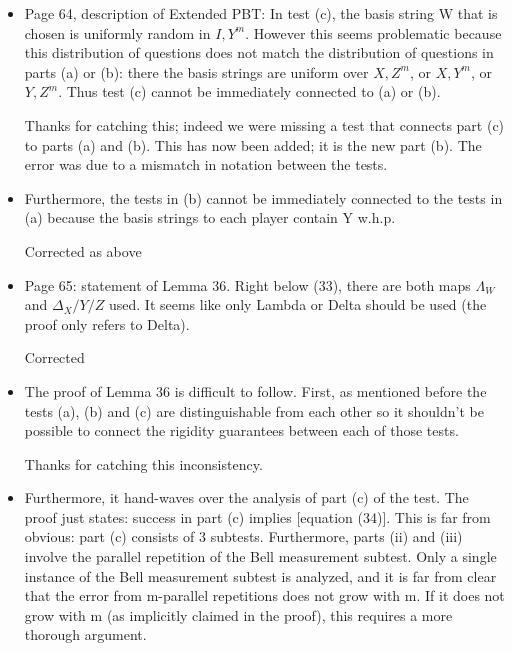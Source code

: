 \documentclass[12pt]{article}
\begin{document}
\begin{itemize}
\item Page 64, description of Extended PBT: In test (c), the basis string W that is chosen is uniformly random in ${I, Y}^m$. However this seems problematic because this distribution of questions does not match the distribution of questions in parts (a) or (b): there the basis strings are uniform over ${X,Z}^m$, or ${X,Y}^m$, or ${Y,Z}^m$. Thus test (c) cannot be immediately connected to (a) or (b).

{\color{blue} Thanks for catching this; indeed we were missing a test that connects part (c) to parts (a) and (b). This has now been added; it is the new part (b). The error was due to a mismatch in notation between the tests.}

\item Furthermore, the tests in (b) cannot be immediately connected to the tests in (a) because the basis strings to each player contain Y w.h.p.

{\color{blue} Corrected as above}

\item Page 65: statement of Lemma 36. Right below (33), there are both maps $\Lambda_W$ and $\Delta_X/Y/Z$ used. It seems like only Lambda or Delta should be used (the proof only refers to Delta).

{\color{blue} Corrected}


\item The proof of Lemma 36 is difficult to follow. First, as mentioned before the tests (a), (b) and (c) are distinguishable from each other so it shouldn't be possible to connect the rigidity guarantees between each of those tests.

{\color{blue} Thanks for catching this inconsistency.}

\item Furthermore,  it hand-waves over the analysis of part (c) of the test. The proof just states: success in part (c) implies [equation (34)]. This is far from obvious: part (c) consists of 3 subtests. Furthermore, parts (ii) and (iii) involve the parallel repetition of the Bell measurement subtest. Only a single instance of the Bell measurement subtest is analyzed, and it is far from clear that the error from m-parallel repetitions does not grow with m.  If it does not grow with m (as implicitly claimed in the proof), this requires a more thorough argument.
\end{itemize}
\end{document}
